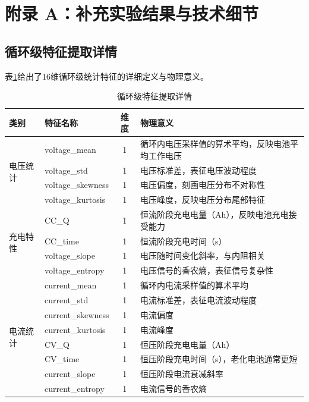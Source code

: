\documentclass[10pt,a4paper]{ctexart}
\begin{document}



\appendix
\section{附录 A：补充实验结果与技术细节}

\subsection{循环级特征提取详情}

表\ref{tab:features}给出了16维循环级统计特征的详细定义与物理意义。

\begin{table}[H]
\centering
\caption{循环级特征提取详情}
\label{tab:features}
\begin{tabular}{@{}llcp{6cm}@{}}
\toprule
\textbf{类别} & \textbf{特征名称} & \textbf{维度} & \textbf{物理意义} \\
\midrule
\multirow{4}{*}{电压统计} 
& voltage\_mean & 1 & 循环内电压采样值的算术平均，反映电池平均工作电压 \\
& voltage\_std & 1 & 电压标准差，表征电压波动程度 \\
& voltage\_skewness & 1 & 电压偏度，刻画电压分布不对称性 \\
& voltage\_kurtosis & 1 & 电压峰度，反映电压分布尾部特征 \\
\midrule
\multirow{4}{*}{充电特性} 
& CC\_Q & 1 & 恒流阶段充电电量（Ah），反映电池充电接受能力 \\
& CC\_time & 1 & 恒流阶段充电时间（s） \\
& voltage\_slope & 1 & 电压随时间变化斜率，与内阻相关 \\
& voltage\_entropy & 1 & 电压信号的香农熵，表征信号复杂性 \\
\midrule
\multirow{8}{*}{电流统计} 
& current\_mean & 1 & 循环内电流采样值的算术平均 \\
& current\_std & 1 & 电流标准差，表征电流波动程度 \\
& current\_skewness & 1 & 电流偏度 \\
& current\_kurtosis & 1 & 电流峰度 \\
& CV\_Q & 1 & 恒压阶段充电电量（Ah） \\
& CV\_time & 1 & 恒压阶段充电时间（s），老化电池通常更短 \\
& current\_slope & 1 & 恒压阶段电流衰减斜率 \\
& current\_entropy & 1 & 电流信号的香农熵 \\
\bottomrule
\end{tabular}
\end{table}
\end{document}
